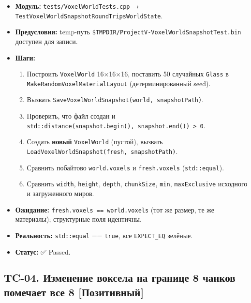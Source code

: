 \begin{itemize}
\tightlist
\item
  \textbf{Модуль:} \texttt{tests/VoxelWorldTests.cpp} → \texttt{TestVoxelWorldSnapshotRoundTripsWorldState}.
\item
  \textbf{Предусловия:} temp-путь \texttt{\$TMPDIR/ProjectV-VoxelWorldSnapshotTest.bin} доступен для записи.
\item
  \textbf{Шаги:}

  \begin{enumerate}
  \def\labelenumi{\arabic{enumi}.}
  \tightlist
  \item
    Построить \texttt{VoxelWorld} 16×16×16, поставить 50 случайных \texttt{Glass} в \texttt{MakeRandomVoxelMaterialLayout} (детерминированный seed).
  \item
    Вызвать \texttt{SaveVoxelWorldSnapshot(world,\ snapshotPath)}.
  \item
    Проверить, что файл создан и \texttt{std::distance(snapshot.begin(),\ snapshot.end())\ \textgreater{}\ 0}.
  \item
    Создать \textbf{новый} \texttt{VoxelWorld} (пустой), вызвать \texttt{LoadVoxelWorldSnapshot(fresh,\ snapshotPath)}.
  \item
    Сравнить побайтово \texttt{world.voxels} и \texttt{fresh.voxels} (\texttt{std::equal}).
  \item
    Сравнить \texttt{width}, \texttt{height}, \texttt{depth}, \texttt{chunkSize}, \texttt{min}, \texttt{maxExclusive} исходного и загруженного миров.
  \end{enumerate}
\item
  \textbf{Ожидание:} \texttt{fresh.voxels\ ==\ world.voxels} (тот же размер, те же материалы); структурные поля идентичны.
\item
  \textbf{Реальность:} \texttt{std::equal} == \texttt{true}, все \texttt{EXPECT\_EQ} зелёные.
\item
  \textbf{Статус:} ✅ Passed.
\end{itemize}

\subsection{TC-04. Изменение воксела на границе 8 чанков помечает все 8 {[}Позитивный{]}}\label{KT-2.2_Test_Report-tc-04-ux438ux437ux43cux435ux43dux435ux43dux438ux435-ux432ux43eux43aux441ux435ux43bux430-ux43dux430-ux433ux440ux430ux43dux438ux446ux435-8-ux447ux430ux43dux43aux43eux432-ux43fux43eux43cux435ux447ux430ux435ux442-ux432ux441ux435-8-ux43fux43eux437ux438ux442ux438ux432ux43dux44bux439}

